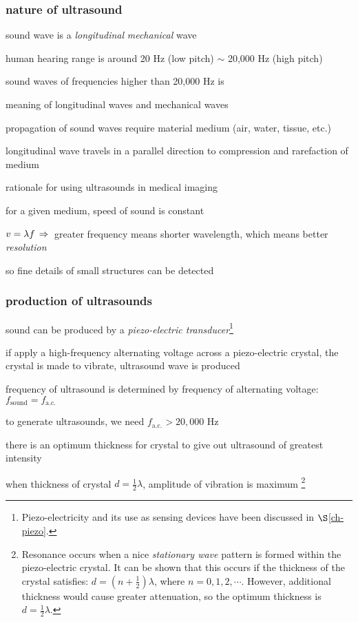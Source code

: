\subsubsection{nature of ultrasound}

sound wave is a \emph{longitudinal} \emph{mechanical} wave

human hearing range is around 20 Hz (low pitch) $\sim$ 20,000 Hz (high pitch)

sound waves of frequencies higher than 20,000 Hz is 

\cmt meaning of longitudinal waves and mechanical waves
	
propagation of sound waves require material medium (air, water, tissue, etc.)
	
longitudinal wave travels in a parallel direction to compression and rarefaction of medium
	
\cmt rationale for using ultrasounds in medical imaging
	
for a given medium, speed of sound is constant

$v=\lambda f \, \Rightarrow \,$ greater frequency means shorter wavelength, which means better \emph{resolution}

so fine details of small structures can be detected


\subsubsection{production of ultrasounds}

sound can be produced by a \emph{piezo-electric transducer}\footnote{Piezo-electricity and its use as sensing devices have been discussed in $\S$\ref{ch-piezo}.}

if apply a high-frequency alternating voltage across a piezo-electric crystal, the crystal is made to vibrate, ultrasound wave is produced

\cmt frequency of ultrasound is determined by frequency of alternating voltage: $f_\text{sound} = f_\text{a.c.}$

to generate ultrasounds, we need $f_\text{a.c.} > 20,000 \text{ Hz}$

\cmt there is an optimum thickness for crystal to give out ultrasound of greatest intensity

when thickness of crystal $d=\frac{1}{2}\lambda$, amplitude of vibration is maximum
\footnote{Resonance occurs when a nice \emph{stationary wave} pattern is formed within the piezo-electric crystal. It can be shown that this occurs if the thickness of the crystal satisfies: $d=\left(n+\frac{1}{2}\right)\lambda$, where $n=0,1,2,\cdots$. However, additional thickness would cause greater attenuation, so the optimum thickness is $d=\frac{1}{2}\lambda$.}

